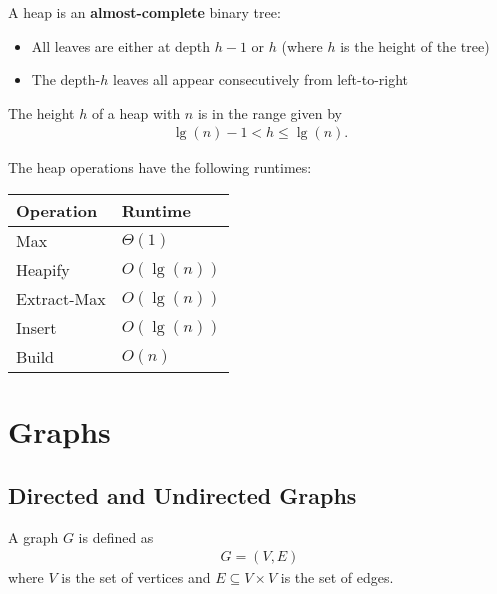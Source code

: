 \documentclass{article}
\begin{document}
\begin{definition}
	A heap is an \textbf{almost-complete} binary tree:
	\begin{itemize}
		\item All leaves are either at depth $h-1$ or $h$ (where $h$ is the height of the tree)
		\item The depth-$h$ leaves all appear consecutively from left-to-right
	\end{itemize}
\end{definition}
\begin{lemma}
	The height $h$ of a heap with $n$ is in the range given by
	\begin{align*}
		\lg(n)-1 < h \leq \lg(n).
	\end{align*}
\end{lemma}
\begin{theorem}
	The heap operations have the following runtimes:
	\\
	\begin{center}
		\begin{tabular}{| l | l |}
			\hline
			Operation   & Runtime     \\
			\hline
			Max         & $\Theta(1)$ \\
			\hline
			Heapify     & $O(\lg(n))$ \\
			\hline
			Extract-Max & $O(\lg(n))$ \\
			\hline
			Insert      & $O(\lg(n))$ \\
			\hline
			Build       & $O(n)$      \\
			\hline
		\end{tabular}
	\end{center}
\end{theorem}


\section{Graphs}


\subsection{Directed and Undirected Graphs}

\begin{definition}
	A graph $G$ is defined as
	\begin{align*}
		G = (V,E)
	\end{align*}
	where $V$ is the set of vertices and $E\subseteq V\times V$ is the set of edges.
\end{definition}
\end{document}
